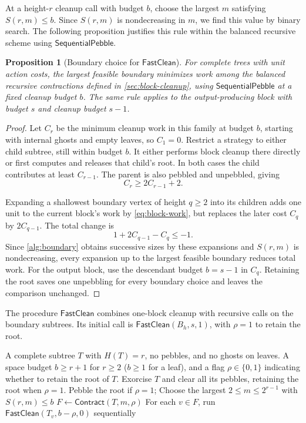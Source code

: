 \documentclass[11pt]{article}
\newtheorem{proposition}[proposition]{Proposition}
\theoremstyle{definition}
\theoremstyle{remark}
\newcommand{\Fast}{\mathsf{SequentialPebble}}
\newcommand{\Clean}{\mathsf{FastClean}}
\newcommand{\Contract}{\mathsf{Contract}}
\begin{document}
At a height-$r$ cleanup call with budget $b$, choose the largest $m$ satisfying $S(r,m)\le b$. Since $S(r,m)$ is nondecreasing in $m$, we find this value by binary search. The following proposition justifies this rule within the balanced recursive scheme using $\Fast$.

\begin{proposition}[Boundary choice for $\Clean$]
\label{prop:greedy-boundary}
For complete trees with unit action costs, the largest feasible boundary minimizes work among the balanced recursive contractions defined in \cref{sec:block-cleanup}, using $\Fast$ at a fixed cleanup budget $b$. The same rule applies to the output-producing block with budget $s$ and cleanup budget $s-1$.
\end{proposition}
\begin{proof}
Let $C_r$ be the minimum cleanup work in this family at budget $b$,
starting with internal ghosts and empty leaves, so $C_1=0$.
Restrict a strategy to either child subtree, still within budget $b$.
It either performs block cleanup there directly or first computes and
releases that child's root.
In both cases the child contributes at least $C_{r-1}$.
The parent is also pebbled and unpebbled, giving
\[
 C_r\ge2C_{r-1}+2.
\]

Expanding a shallowest boundary vertex of height $q\ge2$ into its
children adds one unit to the current block's work by \cref{eq:block-work},
but replaces the later cost $C_q$ by $2C_{q-1}$.
The total change is
\[
1+2C_{q-1}-C_q\le-1.
\]
Since \cref{alg:boundary} obtains successive sizes by these expansions
and $S(r,m)$ is nondecreasing, every expansion up to the largest feasible
boundary reduces total work. For the output block, use the descendant
budget $b=s-1$ in $C_q$. Retaining the root saves one unpebbling for every
boundary choice and leaves the comparison unchanged.
\end{proof}

The procedure $\Clean$ combines one-block cleanup with recursive calls on the boundary subtrees. Its initial call is $\Clean(B_h,s,1)$, with $\rho=1$ to retain the root.

\begin{algorithm}[H]
\caption{Complete-tree block cleanup $\Clean(T,b,\rho)$}
\label{alg:seq-clean}
\begin{algorithmic}[1]
\Require A complete subtree $T$ with $H(T)=r$, no pebbles, and no ghosts on leaves.
\Require A space budget $b\ge r+1$ for $r\ge2$ ($b\ge1$ for a leaf), and a flag $\rho\in\{0,1\}$ indicating whether to retain the root of $T$.
\Ensure Exorcise $T$ and clear all its pebbles, retaining the root when $\rho=1$.
 \State Pebble the root if $\rho=1$; \Return
\EndIf
\State Choose the largest $2\le m\le2^{r-1}$ with $S(r,m)\le b$
\State $F\gets\Contract(T,m,\rho)$
\State For each $v\in F$, run $\Clean(T_v,b-\rho,0)$ sequentially
\end{algorithmic}
\end{algorithm}
\end{document}

